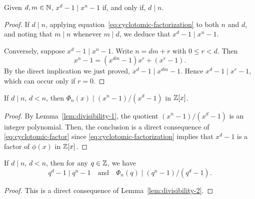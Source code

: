 \begin{lem}\label{lem:divisibility-1}
    Given\/ $d,m\in\mathbb{N}$, $x^d-1\mid x^n-1$ if, and only if, $d\mid n$.
\end{lem}

\begin{proof}
    If\/ $d\mid n$, applying equation~\eqref{eq:cyclotomic-factorization} to both\/ $n$ and\/ $d$, and noting that\/ $m\mid n$ whenever\/ $m\mid d$, we deduce that\/ $x^d-1\mid x^n-1$.

    Conversely, suppose\/ $x^d-1\mid x^n-1$.  
    Write\/ $n=dm+r$ with\/ $0\le r<d$. Then
    \[
        x^n-1 = (x^{dm}-1)x^r + (x^r-1).
    \]
    By the direct implication we just proved,\/ $x^d-1\mid x^{dm}-1$. Hence\/ $x^d-1\mid x^r-1$, which can occur only if\/ $r=0$.
\end{proof}

\begin{lem}\label{lem:divisibility-2}
    If\/ $d\mid n$, $d<n$, then\/ $\Phi_n(x)\mid (x^n-1)/(x^d-1)$ in\/ $\mathbb{Z}[x]$.
\end{lem}

\begin{proof}
    By Lemma~\ref{lem:divisibility-1}, the quotient $(x^n-1)/(x^d-1)$ is an integer polynomial. Then, the conclusion is a direct consequence of \eqref{eq:cyclotomic-factor} since \eqref{eq:cyclotomic-factorization} implies that $x^d-1$ is a factor of $\phi(x)$ in $\mathbb{Z}[x]$.
\end{proof}

\begin{thm}
    If $d\mid n$, $d<n$, then for any $q\in\mathbb{Z}$, we have
    \[
        q^d-1\mid q^n-1\quad\text{and}\quad
        \Phi_n(q)\mid(q^n-1)/(q^d-1).
    \]
    \end{thm}

\begin{proof}
    This is a direct consequence of Lemma~\ref{lem:divisibility-2}.
\end{proof}
